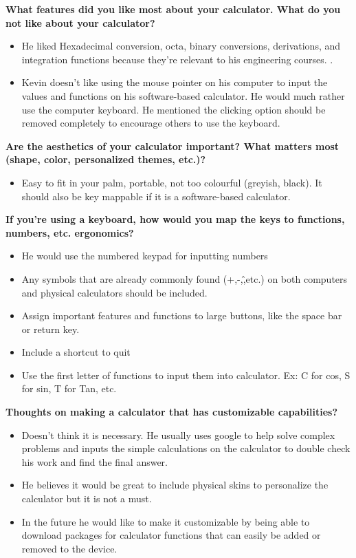 \documentclass[a4paper]{article}
\begin{document}
\textbf{What features did you like most about your calculator. What do you not like about your calculator?}
\begin{itemize}
\itemsep0em 
\item He liked Hexadecimal conversion, octa, binary conversions, derivations, and integration functions because they’re relevant to his engineering courses. .
\item Kevin doesn’t like using the mouse pointer on his computer to input the values and functions on his software-based calculator. He would much rather use the computer keyboard. He mentioned the clicking option should be removed completely to encourage others to use the keyboard. 
\end{itemize}

\textbf{Are the aesthetics of your calculator important? What matters most (shape, color,  personalized themes, etc.)?}
\begin{itemize}
\itemsep0em 
\item Easy to fit in your palm, portable, not too colourful (greyish, black). It should also be key mappable if it is a software-based calculator.
\end{itemize}

\textbf{If you’re using a keyboard, how would you map the keys to functions, numbers, etc. ergonomics?}
\begin{itemize}
\itemsep0em 
\item He would use the numbered keypad for inputting numbers 
\item Any symbols that are already commonly found (+,-,\^,etc.) on both computers and physical calculators should be included.
\item Assign important features and functions to large buttons, like the space bar or return key.
\item Include a shortcut to quit
\item Use the first letter of functions to input them into calculator. Ex: C for cos, S for sin, T for Tan, etc.
\end{itemize}

\textbf{Thoughts on making a calculator that has customizable capabilities? }
\begin{itemize}
\itemsep0em 
\item Doesn’t think it is necessary. He usually uses google to help solve complex problems and inputs the simple calculations on the calculator to double check his work and find the final answer. 
\item He believes it would be great to include physical skins to personalize the calculator but it is not a must.
\item In the future he would like to make it customizable by being able to download packages for calculator functions that can easily be added or removed to the device.
\end{itemize}
\pagebreak
\end{document}
